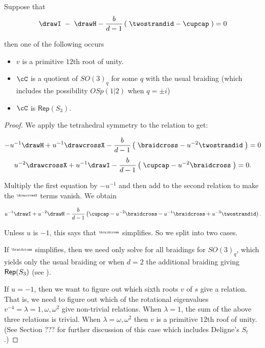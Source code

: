 \documentclass[12pt]{amsart}
\begin{document}
\begin{lemma} \label{lem:IequalsH}
Suppose that 
$$\drawI\;- \; \drawH - \frac{b}{d-1} \left(\; \twostrandid - \cupcap \;\right) = 0$$

then one of the following occurs

\begin{itemize}
\item $v$ is a primitive $12$th root of unity.

\item
$\cC$ is a quotient of $SO(3)_q$ for some $q$ with the usual braiding (which
includes the possibility $OSp(1|2)$ when $q= \pm i$)

\item
$\cC$ is  $\mathsf{Rep}(S_3)$.

\end{itemize}
\end{lemma}
\begin{proof}
We apply the tetrahedral symmetry to the relation to get:

$$-u^{-1} \drawH + u^{-1} \drawcrossX -\frac{b}{d-1} \left(\; \braidcross - u^{-2} \twostrandid \; \right) = 0$$
$$u^{-2} \drawcrossX + u^{-1} \drawI -\frac{b}{d-1} \left(\; \cupcap -u^{-2} \braidcross \; \right) = 0.$$

Multiply the first equation by $-u^{-1}$ and then add to the second relation to make the $\raisebox{0.8mm}{\scalebox{0.5}{\drawcrossX}}$ terms vanish. We obtain

$$u^{-1} \drawI + u^{-2} \drawH - \frac{b}{d-1} \left(\cupcap -u^{-2} \braidcross -u^{-1}\braidcross + u^{-3}\twostrandid  \right).$$

Unless $u$ is $-1$, this says that $\raisebox{0.8mm}{\scalebox{0.5}{\braidcross}}$ simplifies.  So we split into two cases.

If $\raisebox{0.8mm}{\scalebox{0.5}{\braidcross}}$ simplifies, then we need only solve for all braidings for
$SO(3)_q$, which yields only the usual braiding or when $d=2$ the
additional braiding giving $\operatorname{\mathsf{Rep}}(S_3)$ (see \cite[Example 8.6]{MR3624901}).

If $u = -1$, then we want to figure out which sixth roots $v$ of $s$ give a
relation.  That is, we need to figure out which of the rotational eigenvalues
$v^{-4} = \lambda = 1, \omega, \omega^2$ give non-trivial relations.  When
$\lambda = 1$, the sum of the above three relations is trivial.  When $\lambda
= \omega, \omega^2$ then $v$ is a primitive $12$th roof of unity.  (See
Section ??? for further discussion of this case which includes Deligne's
$S_t$.)
\end{proof}
\end{document}
